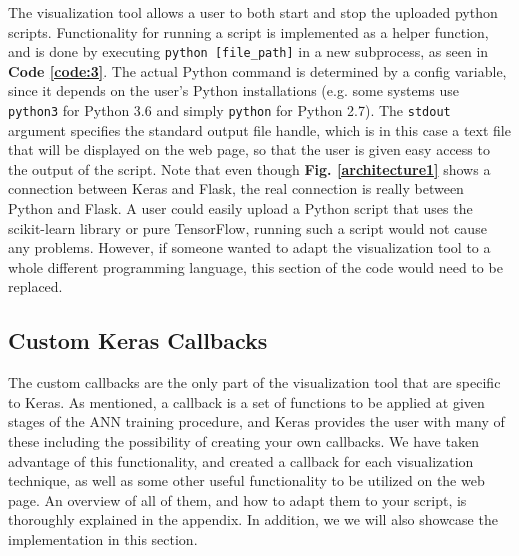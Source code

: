 The visualization tool allows a user to both start and stop the uploaded python scripts. Functionality for running a script is implemented as a helper function, and is done by executing \texttt{python [file\_path]} in a new subprocess, as seen in \textbf{Code \ref{code:3}}. The actual Python command is determined by a config variable, since it depends on the user's Python installations (e.g. some systems use \texttt{python3} for Python 3.6 and simply \texttt{python} for Python 2.7). The \texttt{stdout} argument specifies the standard output file handle, which is in this case a text file that will be displayed on the web page, so that the user is given easy access to the output of the script. Note that even though \textbf{Fig. \ref{architecture1}} shows a connection between Keras and Flask, the real connection is really between Python and Flask. A user could easily upload a Python script that uses the scikit-learn library or pure TensorFlow, running such a script would not cause any problems. However, if someone wanted to adapt the visualization tool to a whole different programming language, this section of the code would need to be replaced.


\subsection{Custom Keras Callbacks}

The custom callbacks are the only part of the visualization tool that are specific to Keras. As mentioned, a callback is a set of functions to be applied at given stages of the ANN training procedure, and Keras provides the user with many of these including the possibility of creating your own callbacks. We have taken advantage of this functionality, and created a callback for each visualization technique, as well as some other useful functionality to be utilized on the web page. An overview of all of them, and how to adapt them to your script, is thoroughly explained in the appendix. In addition, we we will also showcase the implementation in this section.

